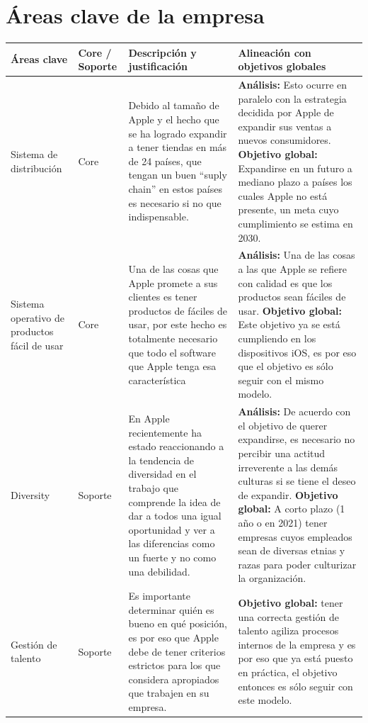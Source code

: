 \documentclass{article}
\begin{document}
\section{Áreas clave de la empresa}
\begin{center}
    \begin{supertabular}{ |p{2cm}|p{2cm}|p{5.5cm}|p{5.5cm}| }
        \hline
            Áreas clave & Core / Soporte & Descripción y justificación & Alineación con objetivos globales \\ 
        \hline
            Sistema de distribución & Core & Debido al tamaño de Apple y el hecho que se ha logrado expandir a tener tiendas en más de 24 países, que tengan un buen ``suply chain'' en estos países es necesario si no que indispensable. & 
            \textbf{Análisis:} Esto ocurre en paralelo con la estrategia decidida por Apple de expandir sus ventas a nuevos consumidores. \textbf{Objetivo global:} Expandirse en un futuro a mediano plazo a países los cuales Apple no está presente, un meta cuyo cumplimiento se estima en 2030. \\
        \hline
            Sistema operativo de productos fácil de usar & Core & Una de las cosas que Apple promete a sus clientes es tener productos de fáciles de usar, por este hecho es totalmente necesario que todo el software que Apple tenga esa característica & 
            \textbf{Análisis:} Una de las cosas a las que Apple se refiere con calidad es que los productos sean fáciles de usar. \textbf{Objetivo global:} Este objetivo ya se está cumpliendo en los dispositivos iOS, es por eso que el objetivo es sólo seguir con el mismo modelo. \\ 
        \hline
            Diversity & Soporte & En Apple recientemente ha estado reaccionando a la tendencia de diversidad en el trabajo que comprende la idea de dar a todos una igual oportunidad y ver a las diferencias como un fuerte y no como una debilidad. & 
            \textbf{Análisis:} De acuerdo con el objetivo de querer expandirse, es necesario no percibir una actitud irreverente a las demás culturas si se tiene el deseo de expandir. \textbf{Objetivo global:} A corto plazo (1 año o en 2021) tener empresas cuyos empleados sean de diversas etnias y razas para poder culturizar la organización.  \\ 
        \hline
            Gestión de talento & Soporte & Es importante determinar quién es bueno en qué posición, es por eso que Apple debe de tener criterios estrictos para los que considera apropiados que trabajen en su empresa. & \textbf{Objetivo global:} tener una correcta gestión de talento agiliza procesos internos de la empresa y es por eso que ya está puesto en práctica, el objetivo entonces es sólo seguir con este modelo. \\ 

\end{supertabular}
\end{center}
\end{document}
